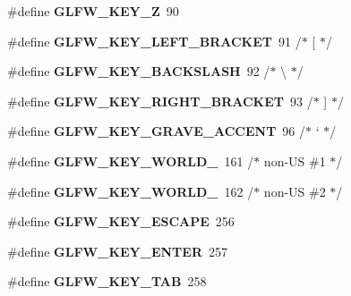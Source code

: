\begin{DoxyCompactItemize}
\mbox{\label{group__keys_gac489e208c26afda8d4938ed88718760a}} 
\#define {\bfseries G\+L\+F\+W\+\_\+\+K\+E\+Y\+\_\+Z}~90
\item 
\mbox{\label{group__keys_gad1c8d9adac53925276ecb1d592511d8a}} 
\#define {\bfseries G\+L\+F\+W\+\_\+\+K\+E\+Y\+\_\+\+L\+E\+F\+T\+\_\+\+B\+R\+A\+C\+K\+ET}~91  /$\ast$ \mbox{[} $\ast$/
\item 
\mbox{\label{group__keys_gab8155ea99d1ab27ff56f24f8dc73f8d1}} 
\#define {\bfseries G\+L\+F\+W\+\_\+\+K\+E\+Y\+\_\+\+B\+A\+C\+K\+S\+L\+A\+SH}~92  /$\ast$ \textbackslash{} $\ast$/
\item 
\mbox{\label{group__keys_ga86ef225fd6a66404caae71044cdd58d8}} 
\#define {\bfseries G\+L\+F\+W\+\_\+\+K\+E\+Y\+\_\+\+R\+I\+G\+H\+T\+\_\+\+B\+R\+A\+C\+K\+ET}~93  /$\ast$ \mbox{]} $\ast$/
\item 
\mbox{\label{group__keys_ga7a3701fb4e2a0b136ff4b568c3c8d668}} 
\#define {\bfseries G\+L\+F\+W\+\_\+\+K\+E\+Y\+\_\+\+G\+R\+A\+V\+E\+\_\+\+A\+C\+C\+E\+NT}~96  /$\ast$ ` $\ast$/
\item 
\mbox{\label{group__keys_gadc78dad3dab76bcd4b5c20114052577a}} 
\#define {\bfseries G\+L\+F\+W\+\_\+\+K\+E\+Y\+\_\+\+W\+O\+R\+L\+D\+\_}~161 /$\ast$ non-\/US \#1 $\ast$/
\item 
\mbox{\label{group__keys_ga20494bfebf0bb4fc9503afca18ab2c5e}} 
\#define {\bfseries G\+L\+F\+W\+\_\+\+K\+E\+Y\+\_\+\+W\+O\+R\+L\+D\+\_}~162 /$\ast$ non-\/US \#2 $\ast$/
\item 
\mbox{\label{group__keys_gaac6596c350b635c245113b81c2123b93}} 
\#define {\bfseries G\+L\+F\+W\+\_\+\+K\+E\+Y\+\_\+\+E\+S\+C\+A\+PE}~256
\item 
\mbox{\label{group__keys_ga9555a92ecbecdbc1f3435219c571d667}} 
\#define {\bfseries G\+L\+F\+W\+\_\+\+K\+E\+Y\+\_\+\+E\+N\+T\+ER}~257
\item 
\mbox{\label{group__keys_ga6908a4bda9950a3e2b73f794bbe985df}} 
\#define {\bfseries G\+L\+F\+W\+\_\+\+K\+E\+Y\+\_\+\+T\+AB}~258

\end{DoxyCompactItemize}
